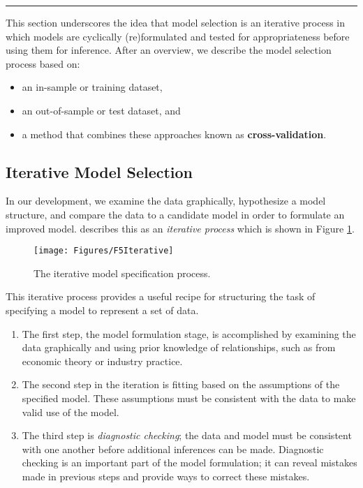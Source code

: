 \documentclass[]{book}
\providecommand{\tightlist}{%
  \setlength{\itemsep}{0pt}\setlength{\parskip}{0pt}}
\theoremstyle{definition}
\theoremstyle{definition}
\theoremstyle{definition}
\theoremstyle{remark}
\begin{document}
\begin{center}\rule{0.5\linewidth}{\linethickness}\end{center}

This section underscores the idea that model selection is an iterative
process in which models are cyclically (re)formulated and tested for
appropriateness before using them for inference. After an overview, we
describe the model selection process based on:

\begin{itemize}
\tightlist
\item
  an in-sample or training dataset,
\item
  an out-of-sample or test dataset, and
\item
  a method that combines these approaches known as
  \textbf{cross-validation}.
\end{itemize}

\subsection{Iterative Model Selection}\label{iterative-model-selection}

In our development, we examine the data graphically, hypothesize a model
structure, and compare the data to a candidate model in order to
formulate an improved model. \citet{box1980sampling} describes this as
an \emph{iterative process} which is shown in Figure
\ref{fig:Iterative}.

\begin{figure}

{\centering \texttt{[image: Figures/F5Iterative]} 

}

\caption{The iterative model specification process.}\label{fig:Iterative}
\end{figure}

This iterative process provides a useful recipe for structuring the task
of specifying a model to represent a set of data.

\begin{enumerate}
\def\labelenumi{\arabic{enumi}.}
\tightlist
\item
  The first step, the model formulation stage, is accomplished by
  examining the data graphically and using prior knowledge of
  relationships, such as from economic theory or industry practice.
\item
  The second step in the iteration is fitting based on the assumptions
  of the specified model. These assumptions must be consistent with the
  data to make valid use of the model.
\item
  The third step is \emph{diagnostic checking}; the data and model must
  be consistent with one another before additional inferences can be
  made. Diagnostic checking is an important part of the model
  formulation; it can reveal mistakes made in previous steps and provide
  ways to correct these mistakes.
\end{enumerate}
\end{document}
